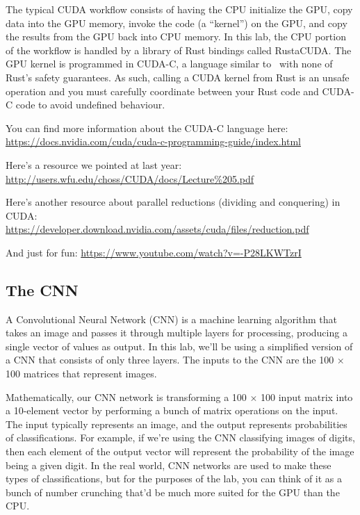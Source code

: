 The typical CUDA workflow consists of having the CPU initialize the GPU, copy data into the GPU memory, invoke the code (a ``kernel'') on the GPU, and copy the results from the GPU back into CPU memory. In this lab, the CPU portion of the workflow is handled by a library of Rust bindings called RustaCUDA. The GPU kernel is programmed in CUDA-C, a language similar to \CPP~with none of Rust's safety guarantees. As such, calling a CUDA kernel from Rust is an unsafe operation and you must carefully coordinate between your Rust code and CUDA-C code to avoid undefined behaviour.

You can find more information about the CUDA-C language here:\\ \url{https://docs.nvidia.com/cuda/cuda-c-programming-guide/index.html}

Here's a resource we pointed at last year:\\
\url{http://users.wfu.edu/choss/CUDA/docs/Lecture%205.pdf}

Here's another resource about parallel reductions (dividing and conquering) in CUDA:\\
\url{https://developer.download.nvidia.com/assets/cuda/files/reduction.pdf}

And just for fun: \url{https://www.youtube.com/watch?v=-P28LKWTzrI}

\subsection*{The CNN}

A Convolutional Neural Network (CNN) is a machine learning algorithm that takes an image and passes it through multiple layers for processing, producing a single vector of values as output. In this lab, we'll be using a simplified version of a CNN that consists of only three layers. The inputs to the CNN are the 100 $\times$ 100 matrices that represent images.

Mathematically, our CNN network is transforming a 100 $\times$ 100 input matrix into a 10-element vector by performing a bunch of matrix operations on the input. The input typically represents an image, and the output represents probabilities of classifications. For example, if we're using the CNN classifying images of digits, then each element of the output vector will represent the probability of the image being a given digit. In the real world, CNN networks are used to make these types of classifications, but for the purposes of the lab, you can think of it as a bunch of number crunching that'd be much more suited for the GPU than the CPU.

